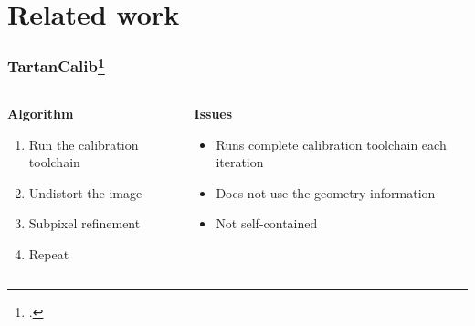 \documentclass{beamer}
\begin{document}
\section{Related work}\label{sec:related_work}

\begin{frame}
	\frametitle{TartanCalib\footcite{duisterhofTartanCalibIterativeWideAngle2022}}

	\begin{columns}
		\begin{column}{0.4\textwidth}
			\textbf{Algorithm}
			\begin{enumerate}
				\item Run the calibration toolchain
				\item Undistort the image
				\item Subpixel refinement
				\item Repeat
			\end{enumerate}
		\end{column}
		\begin{column}{0.6\textwidth}
			\textbf{Issues}
			\begin{itemize}
				\item Runs complete calibration toolchain each iteration
				\item Does not use the geometry information
				\item Not self-contained
			\end{itemize}
		\end{column}
	\end{columns}
\end{frame}
\end{document}
